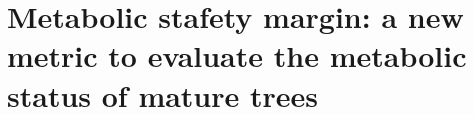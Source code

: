 \documentclass{article}
\begin{document}
%
%
%
%
%
%
%
%
%
%
%


\section{Metabolic stafety margin: a new metric to evaluate the metabolic status of mature trees}
\end{document}
